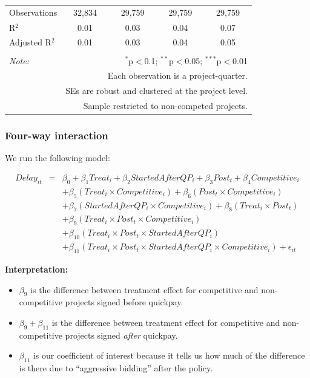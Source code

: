 \documentclass[
]{article}
\providecommand{\tightlist}{%
  \setlength{\itemsep}{0pt}\setlength{\parskip}{0pt}}
\begin{document}
\begin{table}[H]
\begin{tabular}{@{\extracolsep{-2pt}}lcccc}
Observations & 32,834 & 29,759 & 29,759 & 29,759 \\ 
R$^{2}$ & 0.01 & 0.03 & 0.04 & 0.07 \\ 
Adjusted R$^{2}$ & 0.01 & 0.03 & 0.04 & 0.05 \\ 
\hline 
\hline \\[-1.8ex] 
\textit{Note:}  & \multicolumn{4}{r}{$^{*}$p$<$0.1; $^{**}$p$<$0.05; $^{***}$p$<$0.01} \\ 
 & \multicolumn{4}{r}{Each observation is a project-quarter.} \\ 
 & \multicolumn{4}{r}{SEs are robust and clustered at the project level.} \\ 
 & \multicolumn{4}{r}{Sample restricted to non-competed projects.} \\ 
\end{tabular} 
\end{table}

\hypertarget{four-way-interaction}{%
\subsubsection{Four-way interaction}\label{four-way-interaction}}

We run the following model:

\[\begin{aligned} Delay_{it} &=& \beta_0 +\beta_1 Treat_i+ \beta_2 StartedAfterQP_i+ \beta_3 Post_t+ \beta_4 Competitive_i\\ && +  \beta_5 (Treat_i \times Competitive_i) + \beta_6 (Post_t \times Competitive_i)\\ && +  \beta_7 (StartedAfterQP_i \times Competitive_i) +\beta_8 (Treat_i \times Post_t)\\ && + \beta_9 (Treat_i \times Post_t \times Competitive_i) \\ && + \beta_{10} (Treat_i \times Post_t \times StartedAfterQP_i )\\ && + \beta_{11} (Treat_i \times Post_t \times StartedAfterQP_i \times Competitive_i) + \epsilon_{it} \end{aligned}\]

\textbf{Interpretation:}

\begin{itemize}
\tightlist
\item
  \(\beta_9\) is the difference between treatment effect for competitive
  and non-competitive projects signed before quickpay.
\item
  \(\beta_9 + \beta_{11}\) is the difference between treatment effect
  for competitive and non-competitive projects signed \emph{after}
  quickpay.
\item
  \(\beta_{11}\) is our coefficient of interest because it tells us how
  much of the difference is there due to ``aggressive bidding'' after
  the policy.
\end{itemize}
\end{document}
